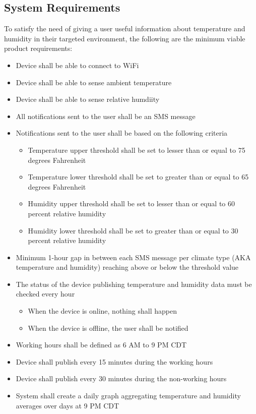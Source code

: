 \documentclass{article}
\begin{document}
\subsection{System Requirements}
To satisfy the need of giving a user useful information about temperature and humidity in their targeted environment, the following are the minimum viable product requirements:

\begin{itemize}
    \setlength{\itemindent}{.3in}
    \item Device shall be able to connect to WiFi
    \item Device shall be able to sense ambient temperature
    \item Device shall be able to sense relative humdiity
	\item All notifications sent to the user shall be an SMS message
	\item Notifications sent to the user shall be based on the following criteria
	      \begin{itemize}
		      \setlength{\itemindent}{.5in}
		      \item Temperature upper threshold shall be set to lesser than or equal to 75 degrees Fahrenheit
		      \item Temperature lower threshold shall be set to greater than or equal to 65 degrees Fahrenheit
		      \item Humidity upper threshold shall be set to lesser than or equal to 60 percent relative humidity
		      \item Humidity lower threshold shall be set to greater than or equal to 30 percent relative humidity
	      \end{itemize}
	\item Minimum 1-hour gap in between each SMS message per climate type (AKA temperature and humidity) reaching above or below the threshold value
	\item The status of the device publishing temperature and humidity data must be checked every hour
	      \begin{itemize}
		      \setlength{\itemindent}{.5in}
		      \item When the device is online, nothing shall happen
		      \item When the device is offline, the user shall be notified
	      \end{itemize}
	\item Working hours shall be defined as 6 AM to 9 PM CDT
	\item Device shall publish every 15 minutes during the working hours
	\item Device shall publish every 30 minutes during the non-working hours
	\item System shall create a daily graph aggregating temperature and humidity averages over days at 9 PM CDT
\end{itemize}
\end{document}
